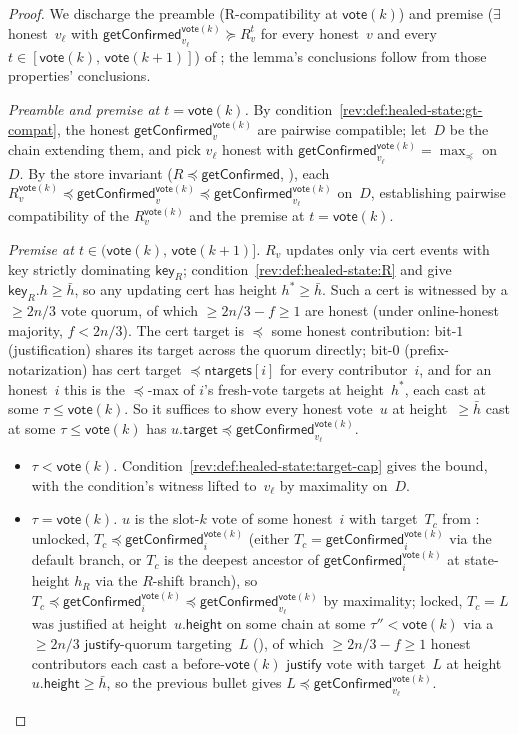 \documentclass{article}
\newcommand{\target}{\mathsf{target}}
\newcommand{\height}{\mathsf{height}}
\newcommand{\just}{\ensuremath{\mathsf{justify}}\xspace}
\newcommand{\ntargets}{\mathsf{ntargets}}
\newcommand{\key}{\mathsf{key}}
\newcommand{\vote}{\mathsf{vote}}
\newcommand{\comm}[1]{\bar{#1}}
\newcommand{\getConfirmed}{\textsf{getConfirmed}\xspace}
\theoremstyle{plain}
\theoremstyle{definition}
\theoremstyle{remark}
\newcommand{\OHM}{online-honest majority\xspace}
\begin{document}
\begin{proof}
We discharge the preamble (R-compatibility at $\vote(k)$) and premise ($\exists$ honest~$v_\ell$ with $\getConfirmed_{v_\ell}^{\vote(k)} \succeq R_v^t$ for every honest~$v$ and every $t \in [\vote(k),\, \vote(k+1)]$) of ; the lemma's conclusions follow from those properties' conclusions.

\emph{Preamble and premise at $t = \vote(k)$.}
By condition~\ref{rev:def:healed-state:gt-compat}, the honest $\getConfirmed_v^{\vote(k)}$ are pairwise compatible; let~$D$ be the chain extending them, and pick $v_\ell$ honest with $\getConfirmed_{v_\ell}^{\vote(k)} = \max_\preceq$ on~$D$. By the store invariant ($R \preceq \getConfirmed$, ), each $R_v^{\vote(k)} \preceq \getConfirmed_v^{\vote(k)} \preceq \getConfirmed_{v_\ell}^{\vote(k)}$ on~$D$, establishing pairwise compatibility of the $R_v^{\vote(k)}$ and the premise at $t = \vote(k)$.

\emph{Premise at $t \in (\vote(k),\, \vote(k+1)]$.}
$R_v$ updates only via cert events with key strictly dominating $\key_R$; condition~\ref{rev:def:healed-state:R} and  give $\key_R.h \geq \comm{h}$, so any updating cert has height $h^* \geq \comm{h}$. Such a cert is witnessed by a $\geq 2n/3$ vote quorum, of which $\geq 2n/3 - f \geq 1$ are honest (under \OHM, $f < 2n/3$). The cert target is $\preceq$ some honest contribution: bit-$1$ (justification) shares its target across the quorum directly; bit-$0$ (prefix-notarization) has cert target $\preceq \ntargets[i]$ for every contributor~$i$, and for an honest~$i$ this is the $\preceq$-max of $i$'s fresh-vote targets at height~$h^*$, each cast at some $\tau \leq \vote(k)$. So it suffices to show every honest vote~$u$ at height~$\geq \comm{h}$ cast at some $\tau \leq \vote(k)$ has $u.\target \preceq \getConfirmed_{v_\ell}^{\vote(k)}$.
\begin{itemize}
  \item \emph{$\tau < \vote(k)$.} Condition~\ref{rev:def:healed-state:target-cap} gives the bound, with the condition's witness lifted to~$v_\ell$ by maximality on~$D$.
  \item \emph{$\tau = \vote(k)$.} $u$ is the slot-$k$ vote of some honest~$i$ with target~$T_c$ from : unlocked, $T_c \preceq \getConfirmed_i^{\vote(k)}$ (either $T_c = \getConfirmed_i^{\vote(k)}$ via the default branch, or $T_c$ is the deepest ancestor of $\getConfirmed_i^{\vote(k)}$ at state-height $h_R$ via the $R$-shift branch), so $T_c \preceq \getConfirmed_i^{\vote(k)} \preceq \getConfirmed_{v_\ell}^{\vote(k)}$ by maximality; locked, $T_c = L$ was justified at height~$u.\height$ on some chain at some $\tau'' < \vote(k)$ via a $\geq 2n/3$ \just-quorum targeting~$L$ (), of which $\geq 2n/3 - f \geq 1$ honest contributors each cast a before-$\vote(k)$ \just vote with target~$L$ at height~$u.\height \geq \comm{h}$, so the previous bullet gives $L \preceq \getConfirmed_{v_\ell}^{\vote(k)}$.
\end{itemize}
\end{proof}
\end{document}
